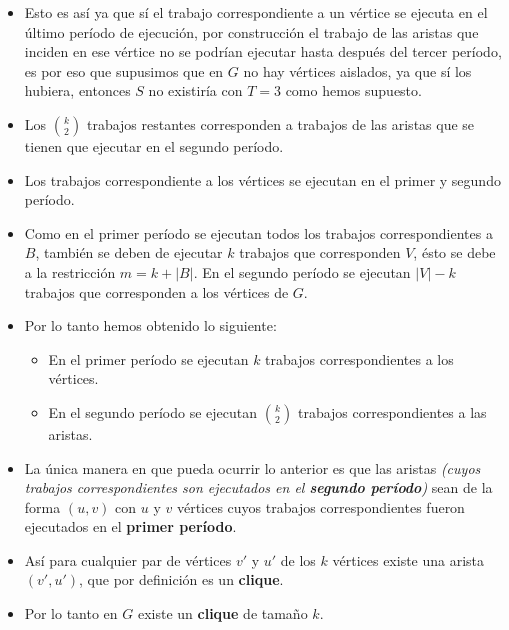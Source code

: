 \documentclass[spanish, xcolor=dvipsnames, aspectratio=169]{beamer}
\newcommand{\subsectiontitle}{}
\begin{document}
\begin{frame}{\subsectiontitle}
    \begin{itemize}
        \item Esto es así ya que sí el trabajo 
            correspondiente a un vértice se ejecuta en el último período de ejecución, por construcción el trabajo de las aristas que inciden en ese vértice no se podrían
            ejecutar hasta después del tercer período, es por eso que supusimos que en \(G\) no hay vértices aislados, ya que sí los hubiera, entonces \(S\)
            no existiría con \(T = 3\) como hemos supuesto.
        \item Los \(\binom{k}{2}\) trabajos              restantes corresponden a trabajos          de las aristas que se tienen que           ejecutar en el segundo período.
        \item Los trabajos correspondiente a los         vértices se ejecutan en el primer y        segundo período.
    \end{itemize}
\end{frame}
\begin{frame}{\subsectiontitle}
\begin{itemize}
    \item Como en el primer período se ejecutan todos los trabajos correspondientes a \(B\), también se deben de ejecutar \(k\) trabajos que corresponden \(V\), ésto se debe a la restricción $m = k + |B|$. En el segundo período se ejecutan \(|V| - k\) trabajos que corresponden a los vértices de $G$.
    \item Por lo tanto hemos obtenido lo siguiente:
    \begin{itemize}
        \item En el primer período se ejecutan $k$
        trabajos correspondientes a los vértices.
        \item En el segundo período se ejecutan $\binom{k}{2}$ trabajos correspondientes a las aristas.
    \end{itemize}
\end{itemize}
\end{frame}
\begin{frame}{\subsectiontitle}
    \begin{itemize}
        \item La única manera en que pueda ocurrir lo anterior es que las aristas \textit{(cuyos trabajos correspondientes son ejecutados en el \textbf{segundo período})} sean de la forma $(u, v)$ con 
        $u$ y $v$ vértices cuyos trabajos correspondientes fueron ejecutados en el \textbf{primer período}.
        \item Así para cualquier par de vértices $v'$ y $u'$ de los $k$ vértices existe una arista $(v', u')$, que por definición es un \textbf{clique}.
        \item Por lo tanto en $G$ existe un 
        \textbf{clique} de tamaño $k$.
    \end{itemize}
\end{frame}
\end{document}
